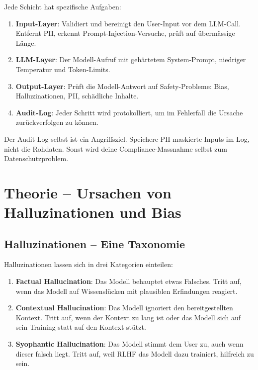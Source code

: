 Jede Schicht hat spezifische Aufgaben:

\begin{enumerate}[leftmargin=*]
    \item \textbf{Input-Layer}: Validiert und bereinigt den User-Input vor dem LLM-Call. Entfernt PII, erkennt Prompt-Injection-Versuche, prüft auf übermässige Länge.
    \item \textbf{LLM-Layer}: Der Modell-Aufruf mit gehärtetem System-Prompt, niedriger Temperatur und Token-Limits.
    \item \textbf{Output-Layer}: Prüft die Modell-Antwort auf Safety-Probleme: Bias, Halluzinationen, PII, schädliche Inhalte.
    \item \textbf{Audit-Log}: Jeder Schritt wird protokolliert, um im Fehlerfall die Ursache zurückverfolgen zu können.
\end{enumerate}

\begin{praxishinweis}
Der Audit-Log selbst ist ein Angriffsziel. Speichere PII-maskierte Inputs im Log, nicht die Rohdaten. Sonst wird deine Compliance-Massnahme selbst zum Datenschutzproblem.
\end{praxishinweis}

\section{Theorie -- Ursachen von Halluzinationen und Bias}

\subsection{Halluzinationen -- Eine Taxonomie}

Halluzinationen lassen sich in drei Kategorien einteilen:

\begin{enumerate}[leftmargin=*]
    \item \textbf{Factual Hallucination}: Das Modell behauptet etwas Falsches. Tritt auf, wenn das Modell auf Wissenslücken mit plausiblen Erfindungen reagiert.
    \item \textbf{Contextual Hallucination}: Das Modell ignoriert den bereitgestellten Kontext. Tritt auf, wenn der Kontext zu lang ist oder das Modell sich auf sein Training statt auf den Kontext stützt.
    \item \textbf{Syophantic Hallucination}: Das Modell stimmt dem User zu, auch wenn dieser falsch liegt. Tritt auf, weil RLHF das Modell dazu trainiert, hilfreich zu sein.
\end{enumerate}

